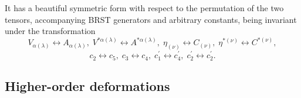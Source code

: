 \documentclass[a4paper,11pt]{article}
\begin{document}
It has a beautiful symmetric form with respect to the permutation of the two
tensors, accompanying BRST generators and arbitrary constants, being
invariant under the transformation
\begin{equation}
V_{\alpha (\lambda )}\longleftrightarrow A_{\alpha (\lambda )},\;V^{*\alpha
(\lambda )}\longleftrightarrow A^{*\alpha (\lambda )},\;\eta _{(\nu
)}\longleftrightarrow C_{(\nu )},\;\eta ^{*(\nu )}\longleftrightarrow
C^{*(\nu )},  \label{bf81}
\end{equation}
\begin{equation}
c_{2}\longleftrightarrow c_{5},\;c_{3}\longleftrightarrow
c_{4},\;c_{1}^{\prime }\longleftrightarrow c_{4}^{\prime },\;c_{2}^{\prime
}\longleftrightarrow c_{2}^{\prime }.  \label{bf80}
\end{equation}

\subsection{Higher-order deformations}
\end{document}
